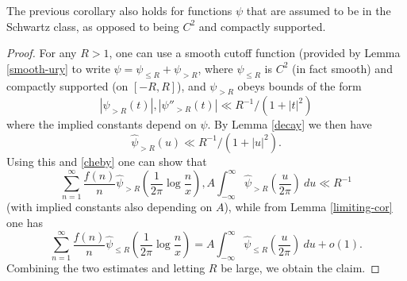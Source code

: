 \begin{lemma}
\label{schwarz-id}
\leanok
The previous corollary also holds for functions $\psi$ that are assumed to be in the Schwartz
  class, as opposed to being $C^2$ and compactly supported.
\end{lemma}
\begin{proof}
\leanok
For any $R>1$, one can use a smooth cutoff function (provided by Lemma \ref{smooth-ury} to write
  $\psi = \psi_{\leq R} + \psi_{>R}$, where $\psi_{\leq R}$ is $C^2$ (in fact smooth) and compactly
  supported (on $[-R,R]$), and $\psi_{>R}$ obeys bounds of the form
  $$ |\psi_{>R}(t)|, |\psi''_{>R}(t)| \ll R^{-1} / (1 + |t|^2) $$
  where the implied constants depend on $\psi$.  By Lemma \ref{decay} we then have
  $$ \hat \psi_{>R}(u) \ll R^{-1} / (1+|u|^2).$$
  Using this and \eqref{cheby} one can show that
  $$ \sum_{n=1}^\infty \frac{f(n)}{n} \hat \psi_{>R}( \frac{1}{2\pi} \log \frac{n}{x} ),
    A \int_{-\infty}^\infty \hat \psi_{>R} (\frac{u}{2\pi})\ du \ll R^{-1} $$
  (with implied constants also depending on $A$), while from Lemma \ref{limiting-cor} one has
  $$ \sum_{n=1}^\infty \frac{f(n)}{n} \hat \psi_{\leq R}( \frac{1}{2\pi} \log \frac{n}{x} )
    = A \int_{-\infty}^\infty \hat \psi_{\leq R} (\frac{u}{2\pi})\ du + o(1).$$
  Combining the two estimates and letting $R$ be large, we obtain the claim.
\end{proof}
